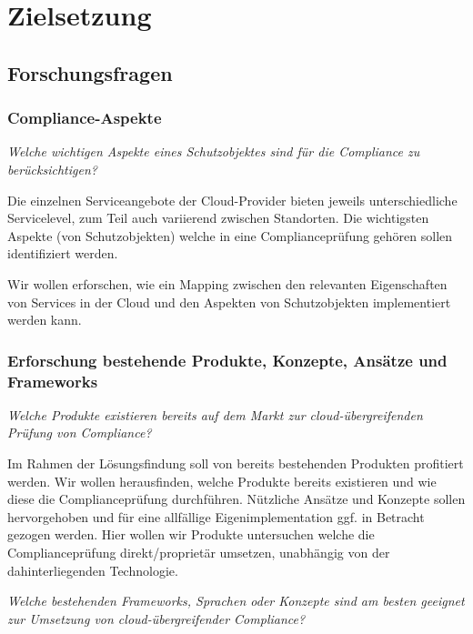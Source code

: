 \section{Zielsetzung}

\subsection{Forschungsfragen}


\subsubsection{Compliance-Aspekte}

\textit{Welche wichtigen Aspekte eines Schutzobjektes sind für die Compliance zu berücksichtigen?}

Die einzelnen Serviceangebote der Cloud-Provider bieten jeweils unterschiedliche Servicelevel, zum Teil auch variierend zwischen Standorten. Die wichtigsten Aspekte (von Schutzobjekten) welche in eine Complianceprüfung gehören sollen identifiziert werden.

Wir wollen erforschen, wie ein Mapping zwischen den relevanten Eigenschaften von Services in der Cloud und den Aspekten von Schutzobjekten implementiert werden kann.


\subsubsection{Erforschung bestehende Produkte, Konzepte, Ansätze und Frameworks}

\textit{Welche Produkte existieren bereits auf dem Markt zur cloud-übergreifenden Prüfung von Compliance?}

Im Rahmen der Lösungsfindung soll von bereits bestehenden Produkten profitiert werden. Wir wollen herausfinden, welche Produkte bereits existieren und wie diese die Complianceprüfung durchführen.
Nützliche Ansätze und Konzepte sollen hervorgehoben und für eine allfällige Eigenimplementation ggf. in Betracht gezogen werden. Hier wollen wir Produkte untersuchen welche die Complianceprüfung direkt/proprietär umsetzen, unabhängig von der dahinterliegenden Technologie.

\textit{Welche bestehenden Frameworks, Sprachen oder Konzepte sind am besten geeignet zur Umsetzung von cloud-übergreifender Compliance?}

